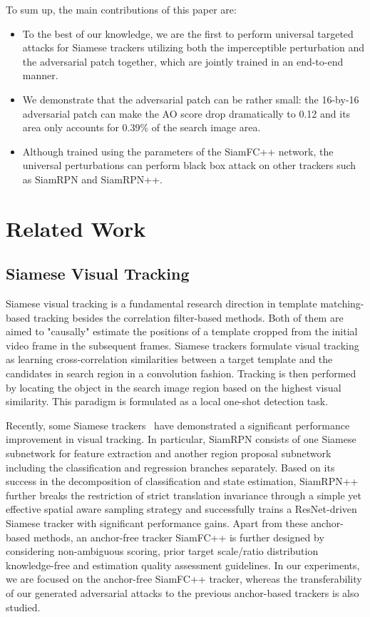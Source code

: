 \documentclass[journal]{IEEEtran}
\begin{document}
To sum up, the main contributions of this paper are:
\begin{itemize}
  \item To the best of our knowledge, we are the first to perform universal targeted attacks for Siamese trackers utilizing both the imperceptible perturbation and the adversarial patch together, which are jointly trained in an end-to-end manner.
  \item We demonstrate that the adversarial patch can be rather small: the 16-by-16 adversarial patch can make the AO score drop dramatically to 0.12 and its area only accounts for 0.39\% of the search image area.
  \item Although trained using the parameters of the SiamFC++ network, the universal perturbations can perform black box attack on other trackers such as SiamRPN and SiamRPN++.
\end{itemize}

\section{Related Work}

\subsection{Siamese Visual Tracking}

Siamese visual tracking is a fundamental research direction in template matching-based tracking besides the correlation filter-based methods. Both of them are aimed to "causally" estimate the positions of a template cropped from the initial video frame in the subsequent frames. Siamese trackers formulate visual tracking as learning cross-correlation similarities between a target template and the candidates in search region in a convolution fashion. Tracking is then performed by locating the object in the search image region based on the highest visual similarity. This paradigm is formulated as a local one-shot detection task.

Recently, some Siamese trackers~\cite{SiamRPN,SiamRPN++,SiamFC++} have demonstrated a significant performance improvement in visual tracking. 
In particular, SiamRPN \cite{SiamRPN} consists of one Siamese subnetwork for feature extraction and another region proposal subnetwork including the classification and regression branches separately. Based on its success in the decomposition of classification and state estimation, SiamRPN++ \cite{SiamRPN++} further breaks the restriction of strict translation invariance through a simple yet effective spatial aware sampling strategy and successfully trains a ResNet-driven Siamese tracker with significant performance gains. Apart from these anchor-based methods, an anchor-free tracker SiamFC++ \cite{SiamFC++} is further designed by considering non-ambiguous scoring, prior target scale/ratio distribution knowledge-free and estimation quality assessment guidelines.
In our experiments, we are focused on the anchor-free SiamFC++ tracker, whereas the transferability of our generated adversarial attacks to the previous anchor-based trackers is also studied.
\end{document}
